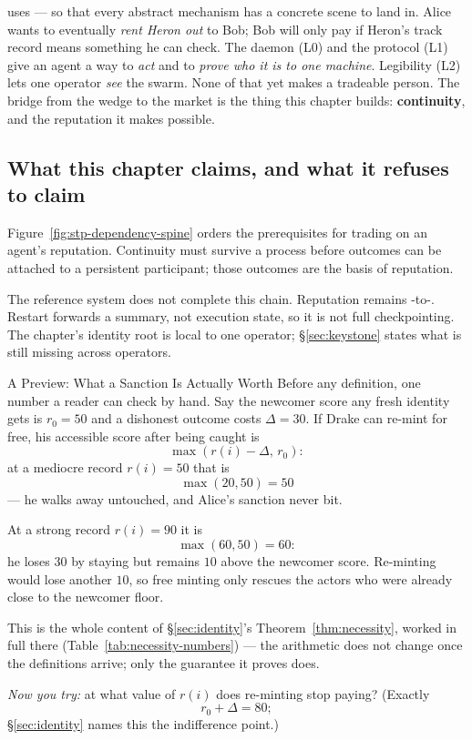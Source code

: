 \documentclass[11pt,a4paper]{article}
\theoremstyle{definition}
\newcounter{protocol}[section]
\begin{document}
uses --- so that every abstract mechanism has a concrete
scene to land in. Alice wants to eventually \emph{rent Heron out} to Bob; Bob will
only pay if Heron's track record means something he can check.
\noindent The
daemon (L0) and the protocol (L1) give an agent a way to \emph{act} and to
\emph{prove who it is to one machine}. Legibility (L2) lets one operator
\emph{see} the swarm. None of that yet makes a tradeable person. The bridge from
the wedge to the market is the thing this chapter builds: \textbf{continuity}, and
the reputation it makes possible.
\subsection{What this chapter claims, and what it refuses to claim}
Figure~\ref{fig:stp-dependency-spine} orders the prerequisites for trading on an
agent's reputation. Continuity must survive a process before outcomes can be
attached to a persistent participant; those outcomes are the basis of reputation.

The reference system does not complete this chain. Reputation remains
\DESIGNED-to-\VISION. Restart forwards a summary, not execution state, so it is
not full checkpointing. The chapter's identity root is local to one operator;
\S\ref{sec:keystone} states what is still missing across operators.
\begin{pdexample}{A Preview: What a Sanction Is Actually Worth}
\setlength{\parskip}{4pt plus 1pt}
Before any definition, one number a reader can check by hand. Say the newcomer
score any fresh identity gets is $r_0=50$ and a dishonest outcome costs
$\Delta=30$.
If Drake can re-mint for free, his accessible score after being
caught is
\[
\max(r(i)-\Delta,\,r_0):
\]
at a mediocre record $r(i)=50$ that is
\[
\max(20,50)=50
\]
--- he walks away untouched, and Alice's sanction never bit.

At a strong record $r(i)=90$ it is
\[
\max(60,50)=60:
\]
he loses $30$ by staying
but remains $10$ above the newcomer score. Re-minting would lose another $10$,
so free minting only rescues the actors who
were already close to the newcomer floor.

This is the whole content of
\S\ref{sec:identity}'s Theorem~\ref{thm:necessity}, worked in full there
(Table~\ref{tab:necessity-numbers}) --- the arithmetic does not change once
the definitions arrive; only the guarantee it proves does.

\emph{Now you
try:} at what value of $r(i)$ does re-minting stop paying? (Exactly
\[
r_0+\Delta=80;
\]
\S\ref{sec:identity} names this the indifference point.)
\end{pdexample}
\end{document}
